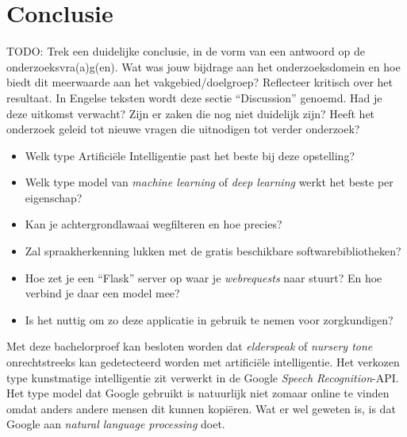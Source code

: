 
\chapter{Conclusie}
\label{ch:conclusie}



\color{blue}
TODO: Trek een duidelijke conclusie, in de vorm van een antwoord op de
 onderzoeksvra(a)g(en). Wat was jouw bijdrage aan het onderzoeksdomein en
 hoe biedt dit meerwaarde aan het vakgebied/doelgroep?
 Reflecteer kritisch over het resultaat. In Engelse teksten wordt deze sectie
 ``Discussion'' genoemd. Had je deze uitkomst verwacht? Zijn er zaken die nog
 niet duidelijk zijn?
 Heeft het onderzoek geleid tot nieuwe vragen die uitnodigen tot verder
onderzoek?


\begin{itemize}
    \item Welk type Artificiële Intelligentie past het beste bij deze opstelling?
    \item Welk type model van \textit{machine learning} of \textit{deep learning} werkt het beste per eigenschap?
    \item Kan je achtergrondlawaai wegfilteren en hoe precies?
    \item Zal spraakherkenning lukken met de gratis beschikbare softwarebibliotheken?
    \item Hoe zet je een ``Flask'' server op waar je \textit{webrequests} naar stuurt? En hoe verbind je daar een model mee?
    \item Is het nuttig om zo deze applicatie in gebruik te nemen voor zorgkundigen?
\end{itemize}

\color{black}

Met deze bachelorproef kan besloten worden dat \textit{elderspeak} of \textit{nursery tone} onrechtstreeks kan gedetecteerd worden met artificiële intelligentie. Het verkozen type kunstmatige intelligentie zit verwerkt in de Google \textit{Speech Recognition}-API.
Het type model dat Google gebruikt is natuurlijk niet zomaar online te vinden omdat anders andere mensen dit kunnen kopiëren. Wat er wel geweten is, is dat Google aan \textit{natural language processing} doet.

